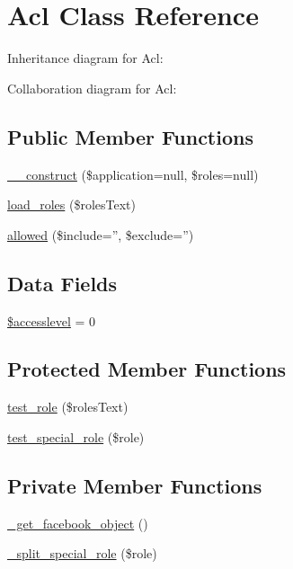 \hypertarget{classAcl}{
\section{Acl Class Reference}
\label{classAcl}
}


Inheritance diagram for Acl:


Collaboration diagram for Acl:
\subsection*{Public Member Functions}
\begin{DoxyCompactItemize}
\item 
\hyperlink{classAcl_a2c0bd6a66035952479bb6364fdb96e4a}{\_\-\_\-construct} (\$application=null, \$roles=null)
\item 
\hyperlink{classAcl_a475e94b92c26da56514558f1bf9fc404}{load\_\-roles} (\$rolesText)
\item 
\hyperlink{classAcl_a93b75f75a1be446708b7bd64432061ea}{allowed} (\$include='', \$exclude='')
\end{DoxyCompactItemize}
\subsection*{Data Fields}
\begin{DoxyCompactItemize}
\item 
\hyperlink{classAcl_a0bf784879d9d0f847c5a766c72f4aa6d}{\$accesslevel} = 0
\end{DoxyCompactItemize}
\subsection*{Protected Member Functions}
\begin{DoxyCompactItemize}
\item 
\hyperlink{classAcl_a885d36340eca004df0ca27db52a86866}{test\_\-role} (\$rolesText)
\item 
\hyperlink{classAcl_a5f138378e1e1a66b6f883abe21648bdc}{test\_\-special\_\-role} (\$role)
\end{DoxyCompactItemize}
\subsection*{Private Member Functions}
\begin{DoxyCompactItemize}
\item 
\hyperlink{classAcl_a0f225c6cb54e2704051d1a401b3f0af7}{\_\-get\_\-facebook\_\-object} ()
\item 
\hyperlink{classAcl_a85d9cb062f447729e5a0770170659627}{\_\-split\_\-special\_\-role} (\$role)
\end{DoxyCompactItemize}
